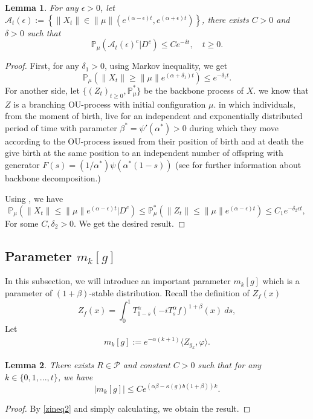 \documentclass{article}
\newtheorem{lemma}{Lemma}[section]
\begin{document}
\begin{lemma}\label{lemma28}
  For any $\epsilon>0$, let $\mathcal{A}_t(\epsilon):=\left\{ \|X_t\|\in \|\mu\|\left(e^{(\alpha-\epsilon)t},e^{(\alpha+\epsilon)t}\right)\right\}$, there exists $C>0$ and $\delta>0$ such that 
  $$\mathbb{P}_{\mu}\left(\mathcal{A}_t(\epsilon)^c|D^c\right)\leq C e^{-\delta t},\quad t\geq 0.$$
\end{lemma}

\begin{proof}
    First, for any $\delta_1>0$, using Markov inequality, we get
    $$\mathbb{P}_{\mu}(\|X_t\|\geq\|\mu\|e^{(\alpha+\delta_1)t})\leq e^{-\delta_1 t}.$$ 
    For another side, let $\{(Z_t)_{t\geq 0}, \mathbb{P}^{\ast}_{\mu}\}$ be the backbone process of $X$. we know that $Z$ is a branching OU-process with initial configuration $\mu$. in which individuals, from the moment of birth, live for an independent and exponentially distributed period of time with parameter $\beta^{\ast}=\psi'(\alpha^{\ast})>0$ during which they move according to the OU-process issued from their position of birth and at death the give birth at the same position to an independent number of offspring with generator $F(s)=(1/\alpha^{\ast})\psi(\alpha^{\ast}(1-s))$ (see \cite{BAM} for further information about backbone decomposition.)
    
    Using \cite[Fact 1.8]{MM}, we have
    $$\mathbb{P}_{\mu}\left(\|X_t\|\leq \|\mu\|e^{(\alpha-\epsilon)t}|D^c\right)\leq\mathbb{P}^{\ast}_{\mu}\left(\|Z_t\|\leq \|\mu\|e^{(\alpha-\epsilon)t}\right) \leq C_1 e^{-\delta_2\epsilon t}, $$
   For some $C,\delta_2>0$.  We get the desired result.
\end{proof}

\subsection{Parameter $m_k[g]$}
 In this subsection, we will introduce an important parameter $m_k[g]$ which is a parameter of $(1+\beta)$-stable distribution. Recall the definition of $Z_f(x)$
 $$Z_f(x)=\int_0^1 T^{\alpha}_{1-s}(-iT_s^{\alpha}f)^{1+\beta}(x)~ds,$$
 Let
 \begin{align}
      m_k[g]:=e^{-\alpha(k+1)}\langle Z_{g_k},\varphi\rangle.
 \end{align}
\begin{lemma}\label{mgineq1}
There exists $R\in \mathcal{P}$ and constant $C>0$ such that for any $k\in \{0,1,...,t\}$, we have 
$$|m_k[g]|\leq C e^{(\alpha\beta-\kappa(g)b(1+\beta))k}.$$
\end{lemma}
\begin{proof}
    By \eqref{zineq2} and simply calculating, we obtain the result.
\end{proof}
\end{document}
